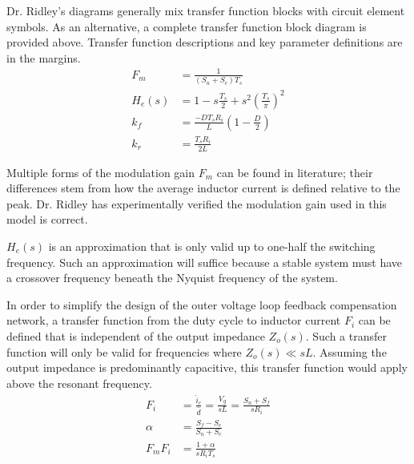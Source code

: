 \documentclass{tufte-handout}
\begin{document}

Dr. Ridley's diagrams generally mix transfer function blocks with circuit element symbols.
As an alternative, a complete transfer function block diagram is provided above.
Transfer function descriptions and key parameter definitions are in the margins.
\begin{align*}
F_m&=\frac{1}{(S_n+S_e)T_s}\\[0.75em]
H_e(s)&=1-s\frac{T_s}{2}+s^2\left(\frac{T_s}{\pi}\right)^2\\[0.75em]
k_f&=\frac{-DT_sR_i}{L}\left(1-\frac{D}{2}\right)\\[0.75em]
k_r&=\frac{T_sR_i}{2L}
\end{align*}

Multiple forms of the modulation gain $F_m$ can be found in literature; their differences stem from how the average inductor current is defined relative to the peak.
Dr. Ridley has experimentally verified the modulation gain used in this model is correct.

$H_e(s)$ is an approximation that is only valid up to one-half the switching frequency.
Such an approximation will suffice because a stable system must have a crossover frequency beneath the Nyquist frequency of the system.

In order to simplify the design of the outer voltage loop feedback compensation network, a transfer function from the duty cycle to inductor current $F_i$ can be defined that is independent of the output impedance $Z_o(s)$.
Such a transfer function will only be valid for frequencies where $Z_o(s) \ll sL$. Assuming the output impedance is predominantly capacitive, this transfer function would apply above the resonant frequency.
\begin{align*}
F_i&=\frac{\widehat{i}_c}{\widehat{d}}=\frac{V_g}{sL}=\frac{S_n+S_f}{sR_i}\\[0.75em]
\alpha&=\frac{S_f-S_e}{S_n+S_e}\\[0.75em]
F_mF_i&=\frac{1+\alpha}{sR_iT_s}
\end{align*}
\end{document}

